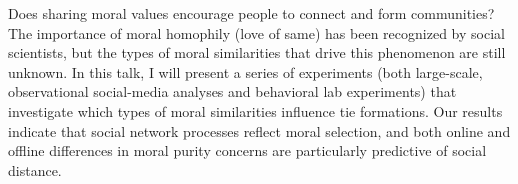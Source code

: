 Does sharing moral values encourage people to connect and form communities? The importance of moral homophily (love of same) has been recognized by social scientists, but the types of moral similarities that drive this phenomenon are still unknown. In this talk, I will present a series of experiments (both large-scale, observational social-media analyses and behavioral lab experiments) that investigate which types of moral similarities influence tie formations. Our results indicate that social network processes reflect moral selection, and both online and offline differences in moral purity concerns are particularly predictive of social distance.
